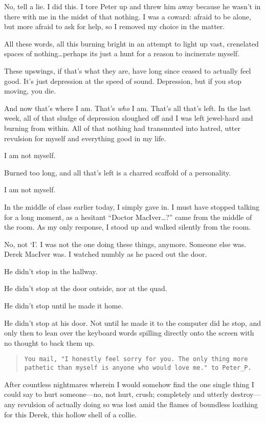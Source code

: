 No, tell a lie. I did this. I tore Peter up and threw him away because he wasn't in there with me in the midst of that nothing. I was a coward: afraid to be alone, but more afraid to ask for help, so I removed my choice in the matter.

All these words, all this burning bright in an attempt to light up vast, crenelated spaces of nothing\ldots{}perhaps its just a hunt for a reason to incinerate myself.

\secdiv{}

\noindent These upswings, if that's what they are, have long since ceased to actually feel good. It's just depression at the speed of sound. Depression, but if you stop moving, you die.

And now that's where I am. That's \emph{who} I am. That's all that's left. In the last week, all of that sludge of depression sloughed off and I was left jewel-hard and burning from within. All of that nothing had transmuted into hatred, utter revulsion for myself and everything good in my life.

I am not myself.

Burned too long, and all that's left is a charred scaffold of a personality.

I am not myself.

In the middle of class earlier today, I simply gave in. I must have stopped talking for a long moment, as a hesitant ``Doctor MacIver\ldots{}?'' came from the middle of the room. As my only response, I stood up and walked silently from the room.

No, not `I'. I was not the one doing these things, anymore. Someone else was. Derek MacIver was. I watched numbly as he paced out the door.

He didn't stop in the hallway.

He didn't stop at the door outside, nor at the quad.

He didn't stop until he made it home.

He didn't stop at his door. Not until he made it to the computer did he stop, and only then to lean over the keyboard words spilling directly onto the screen with no thought to back them up.

\begin{verse}
\texttt{You mail, "I honestly feel sorry for you. The only thing more pathetic than myself is anyone who would love me." to Peter\_P.}
\end{verse}

After countless nightmares wherein I would somehow find the one single thing I could say to hurt someone---no, not hurt, crush; completely and utterly destroy---any revulsion of actually doing so was lost amid the flames of boundless loathing for this Derek, this hollow shell of a collie.

